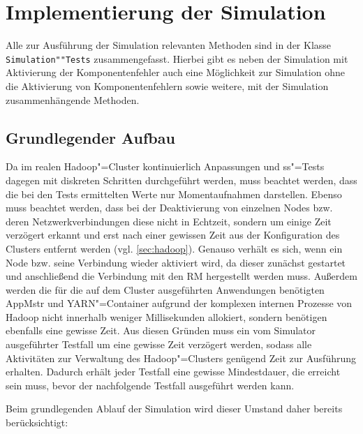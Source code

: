 \section{Implementierung der Simulation}
\label{sec:implSimulation}

Alle zur Ausführung der Simulation relevanten Methoden sind in der Klasse \texttt{Simulation""Tests} zusammengefasst.
Hierbei gibt es neben der Simulation mit Aktivierung der Komponentenfehler auch eine Möglichkeit zur Simulation ohne die Aktivierung von Komponentenfehlern sowie weitere, mit der Simulation zusammenhängende Methoden.

\subsection{Grundlegender Aufbau}
\label{subsec:simulationBasics}

Da im realen Hadoop"=Cluster kontinuierlich Anpassungen und \gls{ss}"=Tests dagegen mit diskreten Schritten durchgeführt werden, muss beachtet werden, dass die bei den Tests ermittelten Werte nur Momentaufnahmen darstellen.
Ebenso muss beachtet werden, dass bei der Deaktivierung von einzelnen Nodes bzw. deren Netzwerkverbindungen diese nicht in Echtzeit, sondern um einige Zeit verzögert erkannt und erst nach einer gewissen Zeit aus der Konfiguration des Clusters entfernt werden (vgl. \cref{sec:hadoop}).
Genauso verhält es sich, wenn ein Node bzw. seine Verbindung wieder aktiviert wird, da dieser zunächst gestartet und anschließend die Verbindung mit den \gls{RM} hergestellt werden muss.
Außerdem werden die für die auf dem Cluster ausgeführten Anwendungen benötigten \gls{AppMstr} und YARN"=Container aufgrund der komplexen internen Prozesse von Hadoop nicht innerhalb weniger Millisekunden allokiert, sondern benötigen ebenfalls eine gewisse Zeit.
Aus diesen Gründen muss ein vom Simulator ausgeführter Testfall um eine gewisse Zeit verzögert werden, sodass alle Aktivitäten zur Verwaltung des Hadoop"=Clusters genügend Zeit zur Ausführung erhalten.
Dadurch erhält jeder Testfall eine gewisse Mindestdauer, die erreicht sein muss, bevor der nachfolgende Testfall ausgeführt werden kann.

Beim grundlegenden Ablauf der Simulation wird dieser Umstand daher bereits berücksichtigt:

